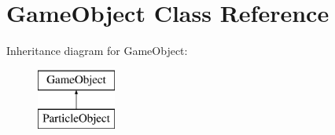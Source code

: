 \hypertarget{class_game_object}{}\section{Game\+Object Class Reference}
\label{class_game_object}
Inheritance diagram for Game\+Object\+:\begin{figure}[H]
\begin{center}
\leavevmode
\includegraphics[height=2.000000cm]{class_game_object}
\end{center}
\end{figure}
